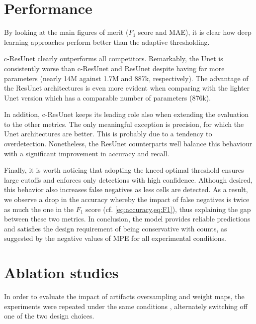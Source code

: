 \section{Performance}

By looking at the main figures of merit ($F_1$ score and MAE), it is clear how deep learning approaches perform better than the adaptive thresholding.

c-ResUnet clearly outperforms all competitors.
Remarkably, the Unet is consistently worse than c-ResUnet and ResUnet despite having far more parameters (nearly 14M against 1.7M and 887k, respectively).
The advantage of the ResUnet architectures is even more evident when comparing with the lighter Unet version which has a comparable number of parameters (876k).

In addition, c-ResUnet keeps its leading role also when extending the evaluation to the other metrics.
The only meaningful exception is precision, for which the Unet architectures are better. This is probably due to a tendency to overdetection. 
Nonetheless, the ResUnet counterparts well balance this behaviour with a significant improvement in accuracy and recall.

Finally, it is worth noticing that adopting the kneed optimal threshold ensures large cutoffs and enforces only detections with high confidence.
Although desired, this behavior also increases false negatives as less cells are detected. 
As a result, we observe a drop in the accuracy whereby the impact of false negatives is twice as much the one in the $F_1$ score (cf. \cref{eq:accuracy,eq:F1}), thus explaining the gap between these two metrics.
In conclusion, the model provides reliable predictions and satisfies the design requirement of being conservative with counts, as suggested by the negative values of MPE for all experimental conditions.

\section{Ablation studies}

In order to evaluate the impact of artifacts oversampling and weight maps, the experiments were repeated under the same conditions%
, alternately switching off one of the two design choices.

